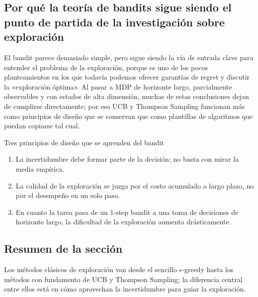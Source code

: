 \subsection{Por qué la teoría de bandits sigue siendo el punto de partida de la investigación sobre exploración}

El bandit parece demasiado simple, pero sigue siendo la vía de entrada clave para entender el problema de la exploración, porque es uno de los pocos planteamientos en los que todavía podemos ofrecer garantías de regret y discutir la «exploración óptima». Al pasar a MDP de horizonte largo, parcialmente observables y con estados de alta dimensión, muchas de estas conclusiones dejan de cumplirse directamente; por eso UCB y Thompson Sampling funcionan más como principios de diseño que se conservan que como plantillas de algoritmos que puedan copiarse tal cual.

\begin{knowledgebox}{Tres principios de diseño que se aprenden del bandit}
\begin{enumerate}
    \item La incertidumbre debe formar parte de la decisión; no basta con mirar la media empírica.
    \item La calidad de la exploración se juzga por el costo acumulado a largo plazo, no por el desempeño en un solo paso.
    \item En cuanto la tarea pasa de un 1-step bandit a una toma de decisiones de horizonte largo, la dificultad de la exploración aumenta drásticamente.
\end{enumerate}
\end{knowledgebox}

\subsection{Resumen de la sección}

Los métodos clásicos de exploración van desde el sencillo $\epsilon$-greedy hasta los métodos con fundamento de UCB y Thompson Sampling; la diferencia central entre ellos está en cómo aprovechan la incertidumbre para guiar la exploración.
